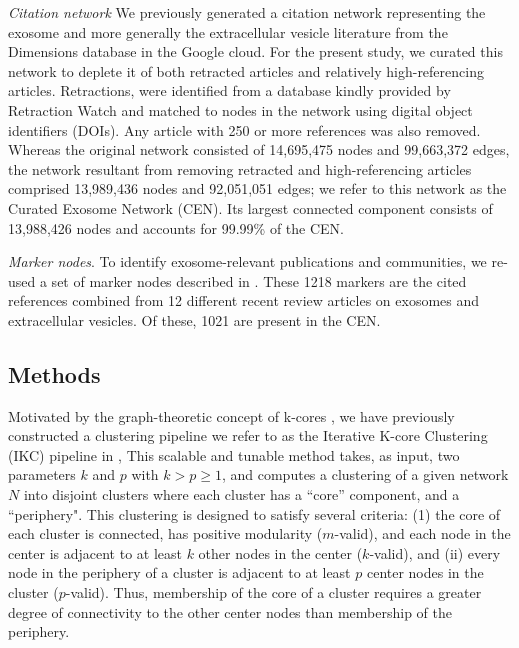\documentclass[12pt, oneside]{article}   	%
\begin{document}
\emph{Citation network} We previously generated a citation network \citep{Wedell2022} representing the exosome \citep{harding1983} and more generally the extracellular vesicle literature \citep{raposo2021} from the Dimensions database \citep{hook2018dimensions} in the Google cloud. For the present study, we curated this network to deplete it of both retracted articles and relatively high-referencing articles. Retractions, were identified from a database kindly provided by Retraction Watch and matched to nodes in the network using digital object identifiers (DOIs). Any article with 250 or more references was also removed. Whereas the original network consisted of 14,695,475 nodes and 99,663,372 edges, the network resultant from removing retracted and high-referencing articles comprised 13,989,436 nodes and 92,051,051 edges; we refer to this network as   the Curated Exosome Network (CEN). Its largest connected component consists of 13,988,426 nodes and accounts for 99.99\% of the CEN.

\emph{Marker nodes}. To identify exosome-relevant publications and communities, we re-used a set of marker nodes described in  \citep{Wedell2022}. These 1218 markers are the cited references combined from 12 different recent review articles on exosomes and extracellular vesicles. Of these, 1021 are present in the CEN. 

\subsection{Methods} Motivated by the graph-theoretic concept of k-cores \citep{Giatsidis2011,malliaros2019}, we have previously constructed a clustering pipeline we refer to as  the Iterative K-core Clustering (IKC) pipeline in \cite{Wedell2022}, This scalable and tunable method takes, as input, two parameters $k$ and $p$ with $k > p \geq 1$, and computes a clustering of a given network $N$ into disjoint clusters where each cluster has a ``core'' component, and a ``periphery". This clustering is designed to satisfy several criteria: (1) the core of each cluster is connected,  has positive modularity ($m$-valid), and each node in the center  is adjacent to at least $k$ other nodes in the center ($k$-valid), and (ii) every node in the periphery of a cluster is adjacent to at least $p$ center nodes in the cluster ($p$-valid). Thus, membership of the core of a cluster requires a greater degree of connectivity to the other center nodes than membership of the periphery. 
\end{document}
